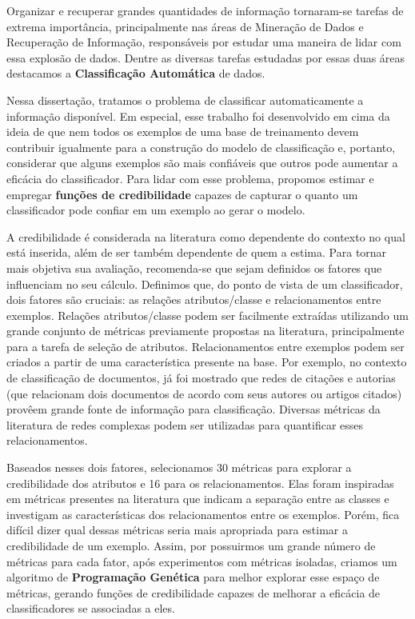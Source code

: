 Organizar e recuperar grandes quantidades de informação tornaram-se tarefas de extrema importância, principalmente nas áreas de Mineração de Dados e Recuperação de Informação, responsáveis por estudar uma maneira de lidar com essa explosão de dados. Dentre as diversas tarefas estudadas por essas duas áreas destacamos a \textbf{Classificação Automática} de dados.

Nessa dissertação, tratamos o problema de classificar automaticamente a informação disponível.
Em especial, esse trabalho foi desenvolvido em cima da ideia de que nem todos os exemplos de uma base de treinamento devem contribuir igualmente para a construção do modelo de classificação e, portanto, considerar que alguns exemplos são mais confiáveis que outros pode aumentar a eficácia do classificador.
Para lidar com esse problema, propomos estimar e empregar \textbf{funções de credibilidade} capazes de capturar o quanto um classificador pode confiar em um exemplo ao gerar o modelo.

A credibilidade é considerada na literatura como dependente do contexto no qual está inserida, além de ser também dependente de quem a estima.
Para tornar mais objetiva sua avaliação, recomenda-se que sejam definidos os fatores que influenciam no seu cálculo.
Definimos que, do ponto de vista de um classificador, dois fatores são cruciais: as relações atributos/classe e relacionamentos entre exemplos. Relações atributos/classe podem ser facilmente extraídas utilizando um grande conjunto de métricas previamente propostas na literatura, principalmente para a tarefa de seleção de atributos. Relacionamentos entre exemplos podem ser criados a partir de uma característica presente na base. Por exemplo, no contexto de classificação de documentos, já foi mostrado que redes de citações e autorias (que relacionam dois documentos de acordo com seus autores ou artigos citados) provêem grande fonte de informação para classificação. Diversas métricas da literatura de redes complexas podem ser utilizadas para quantificar esses relacionamentos.

Baseados nesses dois fatores, selecionamos 30 métricas para explorar a
credibilidade dos atributos e 16 para os relacionamentos. Elas foram inspiradas
em métricas presentes na literatura que indicam a separação entre as classes e
investigam as características dos relacionamentos entre os exemplos. Porém, fica
difícil dizer qual dessas métricas seria mais apropriada para estimar a
credibilidade de um exemplo. Assim, por possuirmos um grande número de métricas
para cada fator, após experimentos com métricas isoladas, criamos um algoritmo de \textbf{Programação Genética} para melhor explorar esse espaço de métricas, gerando funções de credibilidade capazes de melhorar a eficácia de classificadores se associadas a eles.

